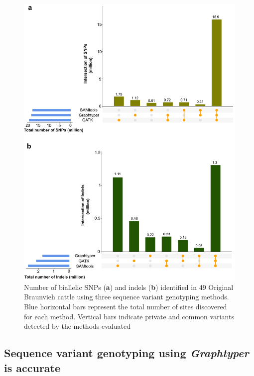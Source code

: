 \documentclass[../main.tex]{subfiles}
\begin{document}
\newpage
\begin{figure}[!htb]
    \centering
    \includegraphics[width=\textwidth]{paper1/main_figure/Figure2.pdf}
    \caption{Number of biallelic SNPs (\textbf{a}) and indels (\textbf{b}) identified in 49 Original Braunvieh cattle using three sequence variant genotyping methods. Blue horizontal bars represent the total number of sites discovered for each method. Vertical bars indicate private and common variants detected by the methods evaluated}
    \label{fig:varoverlap}
\end{figure}

\newpage

\subsection*{Sequence variant genotyping using \emph{Graphtyper} is accurate}
\end{document}
